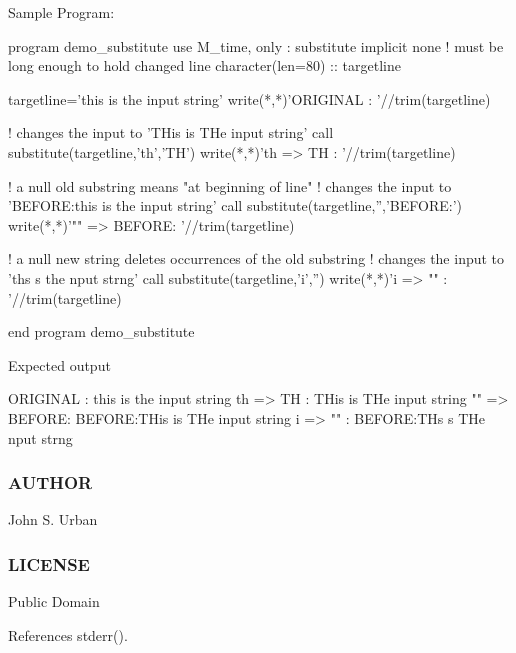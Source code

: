 \begin{DoxyVerb}Sample Program:

 program demo_substitute
 use M_time, only : substitute
 implicit none
 ! must be long enough to hold changed line
 character(len=80) :: targetline

 targetline='this is the input string'
 write(*,*)'ORIGINAL    : '//trim(targetline)

 ! changes the input to 'THis is THe input string'
 call substitute(targetline,'th','TH')
 write(*,*)'th => TH    : '//trim(targetline)

 ! a null old substring means "at beginning of line"
 ! changes the input to 'BEFORE:this is the input string'
 call substitute(targetline,'','BEFORE:')
 write(*,*)'"" => BEFORE: '//trim(targetline)

 ! a null new string deletes occurrences of the old substring
 ! changes the input to 'ths s the nput strng'
 call substitute(targetline,'i','')
 write(*,*)'i => ""     : '//trim(targetline)

 end program demo_substitute

Expected output

 ORIGINAL    : this is the input string
 th => TH    : THis is THe input string
 "" => BEFORE: BEFORE:THis is THe input string
 i => ""     : BEFORE:THs s THe nput strng
\end{DoxyVerb}
 \subsubsection*{A\+U\+T\+H\+OR}

John S. Urban \subsubsection*{L\+I\+C\+E\+N\+SE}

Public Domain 

References stderr().

